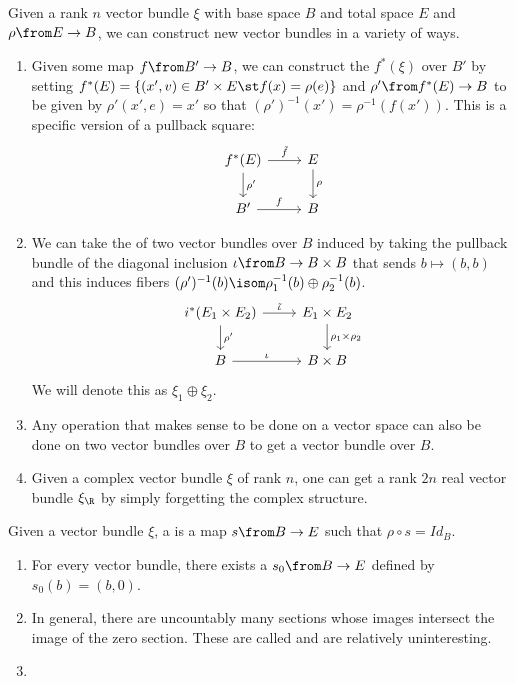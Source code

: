 \documentclass[11pt,leqno,oneside]{amsbook}
\numberwithin{thm}{section}
\begin{document}
\begin{prop}\label{new-bundles-from-old}
  Given a rank \(n\) vector bundle \(\xi\) with base space \(B\) and
  total space 
  \(E\) and \(\rho \from E \to B\), we can construct new vector
  bundles  
  in a variety of ways.
  \begin{enumerate}
  \item Given some map \(f \from B' \to B\), we can construct the
     \(f^*(\xi)\) over \(B'\) by setting \(f^*(E)
    = \{(x',v) \in B' \times E \st f(x) = \rho(e)\}\) and \(\rho'
    \from f^*(E) \to B\) to be given by \(\rho'(x',e) = x'\) so that
    \((\rho')^{-1}(x') = \rho^{-1}(f(x'))\). This is a
    specific version of a pullback square: 
    \[
      \begin{tikzcd}
        f^*(E) \ar[d,"\rho'"] \ar[r,"\tilde{f}"] & E \ar[d,"\rho"]\\
        B' \ar[r, "f"] & B
      \end{tikzcd}
    \]

  \item We can take the  of two vector bundles over
    \(B\) induced by taking the pullback bundle of the diagonal
    inclusion \(\iota \from B \to B \times B\) that sends \(b \mapsto
    (b,b)\) and this induces fibers 
    \((\rho')^{-1}(b) \isom \rho_1^{-1}(b) \oplus \rho_2^{-1}(b)\).
    \[
      \begin{tikzcd}
       i^*(E_1 \times E_2) \ar[d,"\rho' "] \ar[r,"\tilde{\iota}"]& E_1
       \times E_2 \ar[d,"\rho_1 
       \times \rho_2"]\\ 
       B \ar[r, "\iota"] & B \times B
      \end{tikzcd}
    \]
    We will denote this as \(\xi_1 \oplus \xi_2\).
  \item Any operation that makes sense to be done on a vector space
    can also be done on two vector bundles over \(B\) to get a vector
    bundle over \(B\). 
  \item Given a complex vector bundle \(\xi\) of rank \(n\), one can
    get a rank \(2n\) 
    real vector bundle \(\xi_\R\) by simply forgetting the complex
    structure. 
  \end{enumerate}
\end{prop}
\begin{defn}
  Given a vector bundle \(\xi\), a  is a map \(s \from B
  \to E\) such that \(\rho \circ s = Id_B\).
\end{defn}
\begin{example}
  \begin{enumerate}
  \item For every vector bundle, there exists a 
    \(s_0 \from B \to E\) defined by \(s_0(b) = (b,0)\).
  \item In general, there are uncountably many sections whose images
    intersect 
    the image of the zero section. These are called  and are relatively uninteresting.
  \item {}
  \end{enumerate}
\end{example}
\end{document}
